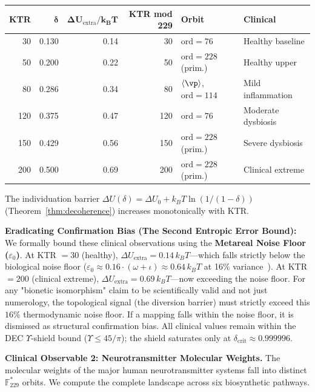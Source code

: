 \begin{center}
\begin{tabular}{@{}rrrrll@{}}
\toprule
\textbf{KTR} & $\boldsymbol{\delta}$ & $\boldsymbol{\Delta U_{\mathrm{extra}}/k_BT}$
  & \textbf{KTR mod 229} & \textbf{Orbit} & \textbf{Clinical} \\
\midrule
30  & 0.130 & 0.14 & 30  & $\mathrm{ord}=76$        & Healthy baseline \\
50  & 0.200 & 0.22 & 50  & $\mathrm{ord}=228$ (prim.)& Healthy upper \\
80  & 0.286 & 0.34 & 80  & $\langle\vp\rangle$, $\mathrm{ord}=114$ & Mild inflammation \\
120 & 0.375 & 0.47 & 120 & $\mathrm{ord}=76$        & Moderate dysbiosis \\
150 & 0.429 & 0.56 & 150 & $\mathrm{ord}=228$ (prim.)& Severe dysbiosis \\
200 & 0.500 & 0.69 & 200 & $\mathrm{ord}=228$ (prim.)& Clinical extreme \\
\bottomrule
\end{tabular}
\end{center}

The individuation barrier $\Delta U(\delta) = \Delta U_0 + k_BT\ln(1/(1-\delta))$
(Theorem~\ref{thm:decoherence}) increases monotonically with KTR.

\textbf{Eradicating Confirmation Bias (The Second Entropic Error Bound):} We formally bound these clinical observations using the \textbf{Metareal Noise Floor ($\varepsilon_0$)}. At KTR $= 30$ (healthy), $\Delta U_\mathrm{extra} = 0.14\,k_BT$---which falls strictly below the biological noise floor ($\varepsilon_0 \approx 0.16 \cdot (\omega+\iota) \approx 0.64\,k_BT$ at 16\% variance~\cite{mrs_variance}). At KTR $= 200$ (clinical extreme), $\Delta U_\mathrm{extra} = 0.69\,k_BT$---now exceeding the noise floor. For any "bionetic isomorphism" claim to be scientifically valid and not just numerology, the topological signal (the diversion barrier) must strictly exceed this $16\%$ thermodynamic noise floor. If a mapping falls within the noise floor, it is dismissed as structural confirmation bias. All clinical values remain within the DEC $\Upsilon$-shield bound ($\Upsilon \leq 45/\pi$); the shield saturates only at $\delta_\mathrm{crit} \approx 0.999996$.

\textbf{Clinical Observable 2: Neurotransmitter Molecular Weights.}
The molecular weights of the major human neurotransmitter systems
fall into distinct $\mathbb{F}_{229}^*$ orbits. We compute the complete
landscape across six biosynthetic pathways.

